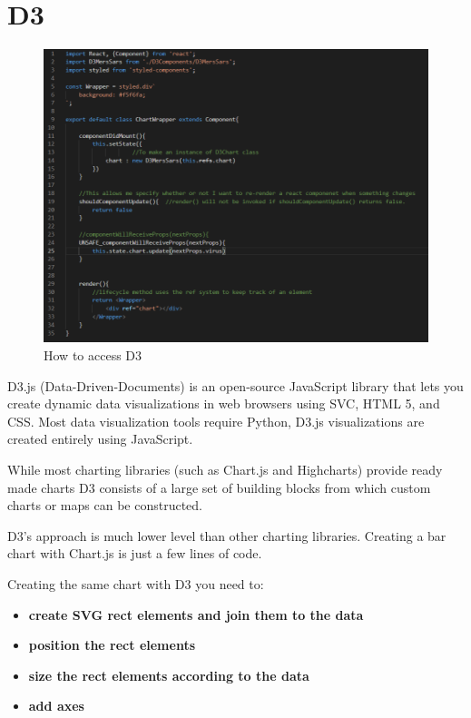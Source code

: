 \section{D3}


\begin{figure}
    \centering
    \includegraphics[scale=0.6]{img/D3Ref.PNG}
    \caption{How to access D3}
    \label{fig:my_label4}
\end{figure}

D3.js (Data-Driven-Documents) is an open-source JavaScript library that lets you create dynamic data visualizations in web browsers using SVC, HTML 5, and CSS.
Most data visualization tools require Python, D3.js visualizations are created entirely using JavaScript.

While most charting libraries (such as Chart.js and Highcharts) provide ready made charts D3 consists of a large set of building blocks from which custom charts or maps can be constructed.

D3’s approach is much lower level than other charting libraries. Creating a bar chart with Chart.js is just a few lines of code.

Creating the same chart with D3 you need to:

\begin{itemize}

\item \textbf{create SVG rect elements and join them to the data}
\item \textbf{position the rect elements}
\item \textbf{size the rect elements according to the data}
\item \textbf{add axes}

\end{itemize}


